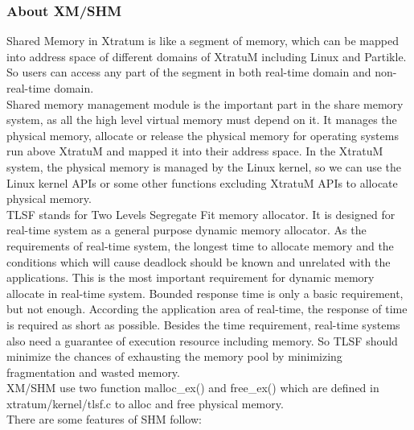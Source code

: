 \subsubsection{About XM/SHM}
Shared Memory in Xtratum is like a segment of memory, which can be mapped into address space of different domains of XtratuM including Linux and Partikle. So users can access any part of the segment in both real-time domain and non-real-time domain.
\\
Shared memory management module is the important part in the share memory system, as all the high level virtual memory must depend on it. It manages the physical memory, allocate or release the physical memory for operating systems run above XtratuM and mapped it into their address space. In the XtratuM system, the physical memory is managed by the Linux kernel, so we can use the Linux kernel APIs or some other functions excluding XtratuM APIs to allocate physical memory. 
\\
TLSF stands for Two Levels Segregate Fit memory allocator. It is designed for real-time system as a general purpose dynamic memory allocator. As the requirements of real-time system, the longest time to allocate memory and the conditions which will cause deadlock should be known and unrelated with the applications. This is the most important requirement for dynamic memory allocate in real-time system. Bounded response time is only a basic requirement, but not enough. According the application area of real-time, the response of time is required as short as possible. Besides the time requirement, real-time systems also need a guarantee of execution resource including memory. So TLSF should minimize the chances of exhausting the memory pool by minimizing fragmentation and wasted memory. \\
XM/SHM use two function malloc\_ex() and free\_ex() which are defined in xtratum/kernel/tlsf.c to alloc and free physical memory. 
\\
There are some features of SHM follow:
